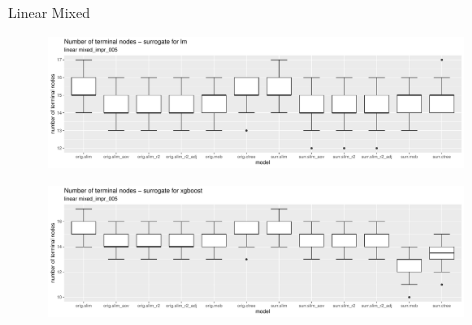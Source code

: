 \documentclass[9pt, xcolor=table]{beamer}
\begin{document}
\begin{frame}{Linear Mixed}
\begin{figure}
    \includegraphics[width=11cm]{Figures/Stability/linear_mixed_impr_005/lm_nofnodes.pdf}
\end{figure}   

\begin{figure}
    \includegraphics[width=11cm]{Figures/Stability/linear_mixed_impr_005/xgboost_nofnodes.pdf}
\end{figure}  

\end{frame}
\end{document}
